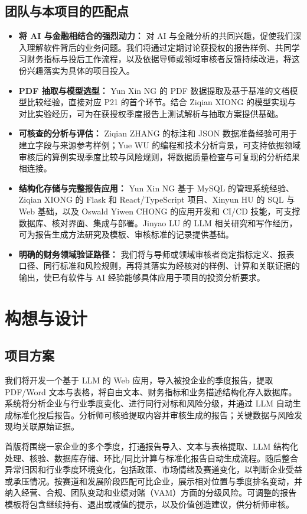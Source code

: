 \documentclass[a4paper,12pt]{article}
\begin{document}
\subsection{团队与本项目的匹配点}
\begin{itemize}
  \item \textbf{将 AI 与金融相结合的强烈动力：} 对 AI 与金融分析的共同兴趣，促使我们深入理解软件背后的业务问题。我们将通过定期讨论获授权的报告样例、共同学习财务指标与投后工作流程，以及依据导师或领域审核者反馈持续改进，将这份兴趣落实为具体的项目投入。
  \item \textbf{PDF 抽取与模型选型：} Yun Xin NG 的 PDF 数据提取及基于基准的文档模型比较经验，直接对应 P21 的首个环节。结合 Ziqian XIONG 的模型实现与对比实验经历，可为在获授权季度报告上测试解析与抽取方案提供基础。
  \item \textbf{可核查的分析与评估：} Ziqian ZHANG 的标注和 JSON 数据准备经验可用于建立字段与来源参考样例；Yue WU 的编程和技术分析背景，可支持依据领域审核后的算例实现季度比较与风险规则，将数据质量检查与可复现的分析结果相连接。
  \item \textbf{结构化存储与完整报告应用：} Yun Xin NG 基于 MySQL 的管理系统经验、Ziqian XIONG 的 Flask 和 React/TypeScript 项目、Xinyun HU 的 SQL 与 Web 基础，以及 Oswald Yiwen CHONG 的应用开发和 CI/CD 技能，可支撑数据库、核对界面、集成与部署。Jinyao LU 的 LLM 相关研究和写作经历，可为报告生成方法研究及模板、审核标准的记录提供基础。
  \item \textbf{明确的财务领域验证路径：} 我们将与导师或领域审核者商定指标定义、报表口径、同行标准和风险规则，再将其落实为经核对的样例、计算和关联证据的输出，使已有软件与 AI 经验能够具体应用于项目的投资分析要求。
\end{itemize}

\newpage

\section{构想与设计}
\subsection{项目方案}
我们将开发一个基于 LLM 的 Web 应用，导入被投企业的季度报告，提取 PDF/Word 文本与表格，将自由文本、财务指标和业务描述结构化存入数据库。系统将分析企业与行业季度变化、进行同行对标和风险分级，并通过 LLM 自动生成标准化投后报告。分析师可核验提取内容并审核生成的报告；关键数据与风险发现均关联原始证据。

首版将围绕一家企业的多个季度，打通报告导入、文本与表格提取、LLM 结构化处理、核验、数据库存储、环比/同比计算与标准化报告自动生成流程。随后整合异常归因和行业季度环境变化，包括政策、市场情绪及赛道变化，以判断企业受益或承压情况。按赛道和发展阶段匹配可比企业，展示相对位置与季度排名变动，并纳入经营、合规、团队变动和业绩对赌（VAM）方面的分级风险。可调整的报告模板将包含继续持有、退出或减值的提示，以及价值创造建议，供分析师审核。
\end{document}
